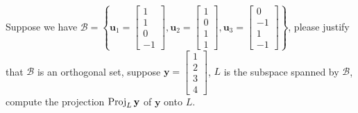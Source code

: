 \documentclass[a4paper,10pt]{article}
\begin{document}
\begin{problem}
Suppose we have $\mathcal B=\left\{\mathbf u_1=\begin{bmatrix}1\\1\\0\\-1\end{bmatrix},\mathbf u_2=\begin{bmatrix}1\\0\\1\\1\end{bmatrix},\mathbf u_3=\begin{bmatrix}0\\-1\\1\\-1\end{bmatrix}\right\}$, please justify that $\mathcal B$ is an orthogonal set, suppose $\mathbf y=\begin{bmatrix}1\\2\\3\\4\end{bmatrix}$, $L$ is the subspace spanned by $\mathcal B$, compute the projection $\operatorname{Proj}_L\mathbf y$ of $\mathbf y$ onto $L$.
\end{problem}
\end{document}
